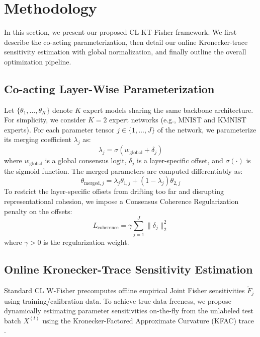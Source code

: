 \documentclass{article}
\theoremstyle{plain}
\theoremstyle{definition}
\theoremstyle{remark}
\begin{document}
\section{Methodology}
\label{sec:methodology}
In this section, we present our proposed CL-KT-Fisher framework. We first describe the co-acting parameterization, then detail our online Kronecker-trace sensitivity estimation with global normalization, and finally outline the overall optimization pipeline.

\subsection{Co-acting Layer-Wise Parameterization}
Let $\{\theta_1, \dots, \theta_K\}$ denote $K$ expert models sharing the same backbone architecture. For simplicity, we consider $K=2$ expert networks (e.g., MNIST and KMNIST experts). For each parameter tensor $j \in \{1, \dots, J\}$ of the network, we parameterize its merging coefficient $\lambda_j$ as:
\begin{equation}
    \lambda_j = \sigma(w_{\text{global}} + \delta_j)
\end{equation}
where $w_{\text{global}}$ is a global consensus logit, $\delta_j$ is a layer-specific offset, and $\sigma(\cdot)$ is the sigmoid function. The merged parameters are computed differentiably as:
\begin{equation}
    \theta_{\text{merged}, j} = \lambda_j \theta_{1, j} + (1 - \lambda_j) \theta_{2, j}
\end{equation}
To restrict the layer-specific offsets from drifting too far and disrupting representational cohesion, we impose a Consensus Coherence Regularization penalty on the offsets:
\begin{equation}
    L_{\text{coherence}} = \gamma \sum_{j=1}^J \|\delta_j\|_2^2
\end{equation}
where $\gamma > 0$ is the regularization weight.

\subsection{Online Kronecker-Trace Sensitivity Estimation}
Standard CL W-Fisher precomputes offline empirical Joint Fisher sensitivities $\tilde{F}_j$ using training/calibration data. To achieve true data-freeness, we propose dynamically estimating parameter sensitivities on-the-fly from the unlabeled test batch $X^{(t)}$ using the Kronecker-Factored Approximate Curvature (KFAC) trace \citep{martens2015optimizing, he2024ktfisher}.
\end{document}
